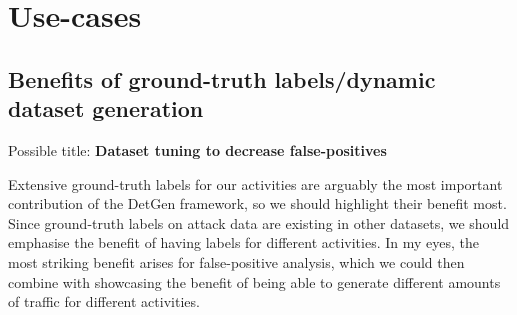 \documentclass[sigconf]{acmart}
\begin{document}
%
%
%



\section{Use-cases}


\subsection{Benefits of ground-truth labels/dynamic dataset generation}
Possible title: \textbf{Dataset tuning to decrease false-positives}

Extensive ground-truth labels for our activities are arguably the most important contribution of the DetGen framework, so we should highlight their benefit most. Since ground-truth labels on attack data are existing in other datasets, we should emphasise the benefit of having labels for different activities. In my eyes, the most striking benefit arises for false-positive analysis, which we could then combine with showcasing the benefit of being able to generate different amounts of traffic for different activities.
\end{document}
